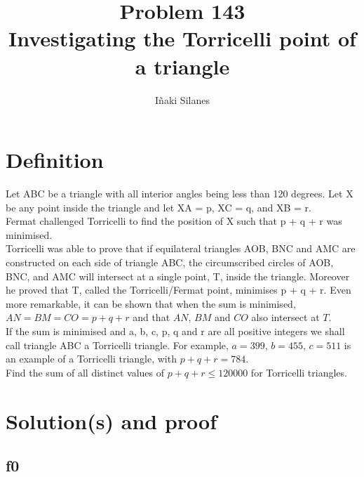\documentclass[english]{article}
\begin{document}
\newcommand{\mc}{\multicolumn}
\newcommand{\mr}{\multirow}
\newcommand{\cw}{\columnwidth}
\newcommand{\ig}[2]{\texttt{[image: \#2]}}

\title{Problem 143\\Investigating the Torricelli point of a triangle}
\author{I\~naki Silanes}
\maketitle

\section{Definition}

Let ABC be a triangle with all interior angles being less than 120 degrees. Let X be any point inside the triangle and let XA = p, XC = q, and XB = r.\\

Fermat challenged Torricelli to find the position of X such that p + q + r was minimised.\\

Torricelli was able to prove that if equilateral triangles AOB, BNC and AMC are constructed on each side of triangle ABC, the circumscribed circles of AOB, BNC, and AMC will intersect at a single point, T, inside the triangle. Moreover he proved that T, called the Torricelli/Fermat point, minimises p + q + r. Even more remarkable, it can be shown that when the sum is minimised, $AN = BM = CO = p + q + r$ and that $AN$, $BM$ and $CO$ also intersect at $T$.\\

If the sum is minimised and a, b, c, p, q and r are all positive integers we shall call triangle ABC a Torricelli triangle. For example, $a = 399$, $b = 455$, $c = 511$ is an example of a Torricelli triangle, with $p + q + r = 784$.\\

Find the sum of all distinct values of $p + q + r \leq 120000$ for Torricelli triangles.

\section{Solution(s) and proof}

\subsection{f0}
\end{document}
